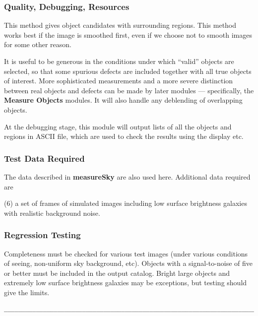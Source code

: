 \subsubsection {Quality, Debugging, Resources}

This method gives object candidates with surrounding regions.
This method works best if the image is smoothed first,
even if we choose not to smooth images for some other reason.

It is useful to be generous in the conditions under which ``valid''
objects are selected, so that some spurious defects are included
together with all true objects of interest.  
More sophisticated measurements and a more severe 
distinction between real objects and defects can be made by
later modules --- specifically, the {\bf Measure Objects} modules.
It will also handle any deblending of overlapping objects.

At the debugging stage, this module will output lists of all the objects and 
regions in ASCII file, which are used to check the results using the display
etc. 

\subsubsection {Test Data Required}

The data described in {\bf measureSky} are also used here.
Additional data required are 

\begin{description}
\item{\quad } (6) a set of frames of simulated images including low
surface brightness galaxies with realistic background noise.
\end{description}

\subsubsection {Regression Testing}

Completeness must be checked for various test images 
(under various conditions of seeing, non-uniform sky background, etc).
Objects with a signal-to-noise of five or 
better must be included in the output catalog.
Bright large objects and extremely low surface brightness galaxies may be 
exceptions, but testing should give the limits.


\begin{verbatim}
__________________________________________________________________________
\end{verbatim}

